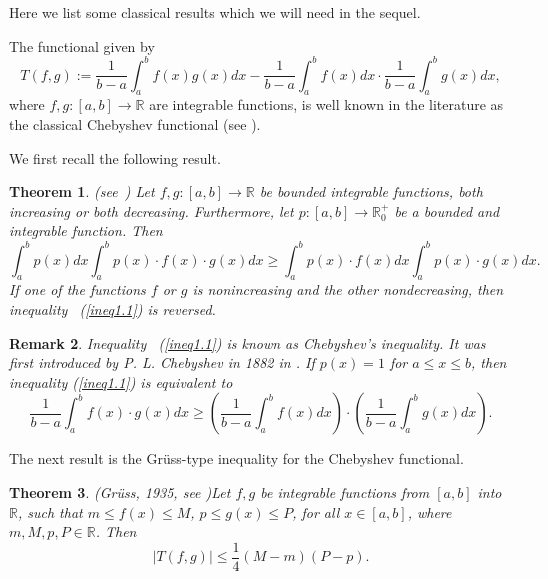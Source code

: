 \documentclass[12pt,leqno,a4paper,dvips,twoside]{article}
\newcommand*{\R}{\ensuremath{\mathbb{R}}}               %
\newtheorem{thm}{Theorem}[section]
\newtheorem{rema}[thm]{Remark}%
\begin{document}
{Here we list some classical results which we will need in the sequel.

The functional given by
\begin{equation*}
T(f,g):=\frac{1}{b-a}\int_{a}^{b}f(x)g(x)dx-\frac{1}{b-a}\int_{a}^{b}f(x)dx\cdot\frac{1}{b-a}\int_{a}^{b}g(x)dx,
\end{equation*}
where $f,g:[a,b]\to \R$ are integrable functions, is well known in the literature as the
classical Chebyshev functional (see \cite{che:fr}).

We first recall the following result. 

\begin{thm}(see~\cite{mitpefi:1993})
	Let $f,g:[a,b]\to\R$ be bounded integrable functions, both increasing or both decreasing. Furthermore, let $p:[a,b]\to\R^{+}_{0}$ be a bounded and integrable function. Then
	\begin{equation}\label{ineq1.1}
		\int^b_a{p(x)dx}\int^b_a{p(x)\cdot f(x)\cdot g(x)dx}\geq\int^b_a{p(x)\cdot f(x)dx}\int^b_a{p(x)\cdot g(x)dx}.
	\end{equation}
If one of the functions $f$ or $g$ is nonincreasing and the other nondecreasing, then inequality ~(\ref{ineq1.1}) is reversed. 
\end{thm}

\begin{rema}
	Inequality ~(\ref{ineq1.1}) is known as Chebyshev's inequality. It was first introduced by P. L. Chebyshev in 1882 in \cite{che:1882}. 
	If $p(x)=1$ for $a\leq x\leq b$, then inequality (\ref{ineq1.1}) is equivalent to 
		\begin{equation*}
			\frac{1}{b-a}\int^{b}_{a}{f(x)\cdot g(x) dx}\geq \left(\frac{1}{b-a}\int^{b}_{a}{f(x) dx}\right)\cdot\left(\frac{1}{b-a}\int^{b}_{a}{g(x) dx}\right).
		\end{equation*}	 
\end{rema}

The next result is the Gr\"{u}ss-type inequality for the Chebyshev functional.

\begin{thm}(Gr\"{u}ss, 1935, see \cite{gruess:1935})\label{t1}
Let $f, g$ be integrable functions from $[a,b]$ into $\R$, such that $m\leq f(x)\leq M$, $p\leq g(x)\leq P$, for
all $x\in [a,b]$, where $m,M,p,P\in\R$. Then
	\begin{equation*}
		\left|T(f,g)\right|\leq \frac{1}{4}(M-m)(P-p).
	\end{equation*}
\end{thm}

}
\end{document}
